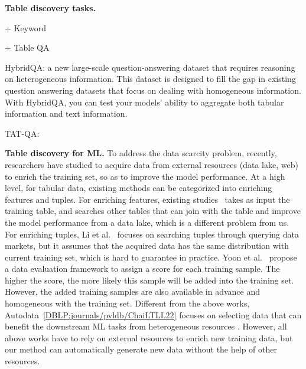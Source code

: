 \noindent \textbf{Table discovery tasks.}

+ Keyword

+ Table QA

HybridQA: a new large-scale question-answering dataset that requires reasoning on heterogeneous information. This dataset is designed to fill the gap in existing question answering datasets that focus on dealing with homogeneous information. With HybridQA, you can test your models' ability to aggregate both tabular information and text information.

TAT-QA: 


\noindent \textbf{Table discovery for ML.}
To address the data scarcity problem, recently, researchers have studied to acquire data from external resources (\eg data lake, web) to enrich the training set, so as to improve the model performance. At a high level, for tabular data, existing methods can be categorized into enriching features and tuples.
For enriching features, existing studies~\cite{DBLP:conf/icde/LiuCLLFT22,
	DBLP:journals/pvldb/ChepurkoMZFKK20,
	DBLP:conf/sigmod/KumarNPZ16} takes as input the training table, and searches other tables that can join with the table and improve the model performance from a data lake, which is a different problem from us.
For enriching tuples, Li et al.~\cite{DBLP:conf/icml/YoonAP20} focuses on searching tuples through querying data markets, but it assumes that the acquired data has the same distribution with current training set, which is hard to guarantee in practice. Yoon et al.~\cite{DBLP:journals/pvldb/LiYK21} propose a data evaluation framework to assign a score for each training sample. The higher the score, the more likely this sample will be added into the training set.  However, the added training samples are also available in advance and homogeneous with the training set. Different from the above works, Autodata~\ref{DBLP:journals/pvldb/ChaiLTLL22} focuses on selecting data that can benefit the downstream ML tasks from heterogeneous resources . However, all  above works have to rely on external resources to enrich new training data, but our method can automatically generate new data without the help of other resources.